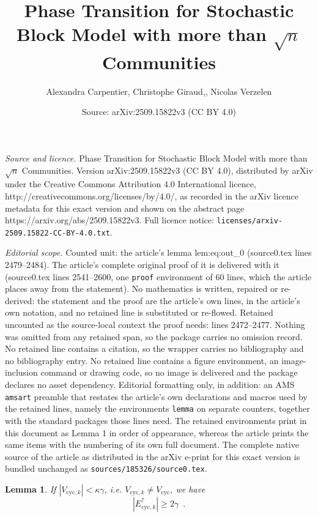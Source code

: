 \documentclass[10pt,a4paper]{amsart}
\title{Phase Transition for Stochastic Block Model with more than $\sqrt{n}$ Communities}
\author{Alexandra Carpentier, Christophe Giraud,, Nicolas Verzelen}
\date{Source: arXiv:2509.15822v3 (CC BY 4.0)}
\newtheorem{lemma}{Lemma}
\begin{document}
\maketitle

\noindent\emph{Source and licence.} Phase Transition for Stochastic Block Model with more than $\sqrt{n}$ Communities. Version arXiv:2509.15822v3 (CC BY 4.0), distributed by arXiv under the Creative Commons Attribution 4.0 International licence, http://creativecommons.org/licenses/by/4.0/, as recorded in the arXiv licence metadata for this exact version and shown on the abstract page https://arxiv.org/abs/2509.15822v3. Full licence notice: \texttt{licenses/arxiv-2509.15822-CC-BY-4.0.txt}.\par\smallskip

\noindent\textit{Editorial scope.} Counted unit: the article's lemma lem:eq:out\_0 (source0.tex lines 2479--2484). The article's complete original proof of it is delivered with it (source0.tex lines 2541--2600, one \texttt{proof} environment of 60 lines, which the article places away from the statement). No mathematics is written, repaired or re-derived: the statement and the proof are the article's own lines, in the article's own notation, and no retained line is substituted or re-flowed.  Retained uncounted as the source-local context the proof needs: lines 2472--2477.  Nothing was omitted from any retained span, so the package carries no omission record.  No retained line contains a citation, so the wrapper carries no bibliography and no bibliography entry.  No retained line contains a figure environment, an image-inclusion command or drawing code, so no image is delivered and the package declares no asset dependency.  Editorial formatting only, in addition: an AMS \texttt{amsart} preamble that restates the article's own declarations and macros used by the retained lines, namely the environments \texttt{lemma} on separate counters, together with the standard packages those lines need.  The retained environments print in this document as Lemma 1 in order of appearance, whereas the article prints the same items with the numbering of its own full document.  The complete native source of the article as distributed in the arXiv e-print for this exact version is bundled unchanged as \texttt{sources/185326/source0.tex}.
\begin{lemma}\label{lem:Ecyc_k}
If $|V_{\mathrm{cyc},k}| < \kappa \gamma$, i.e. $V_{\mathrm{cyc},k}\neq V_{\mathrm{cyc}}$, we have 
\[
|E_{\mathrm{cyc},k}^{\uparrow}|\geq 2\gamma\enspace . 
\]
\end{lemma}
\end{document}
